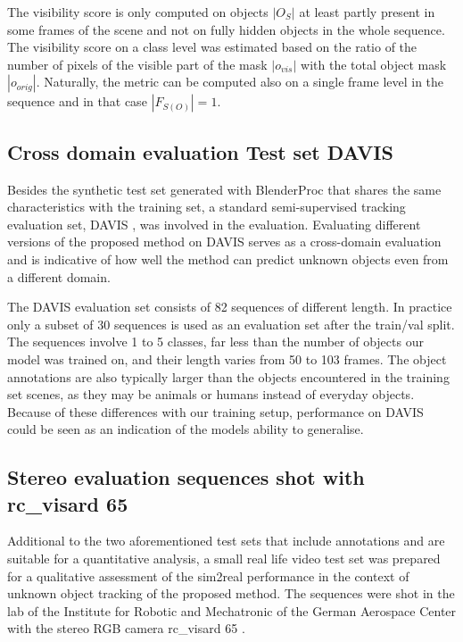  The visibility score is only computed on objects $|O_S|$ at least partly present in some frames of the scene and not on fully hidden objects in the whole sequence. The visibility score on a class level was estimated based on the ratio of the number of pixels of the visible part of the mask $|o_{vis}|$ with the total object mask $|o_{orig}|$. Naturally, the metric can be computed also on a single frame level in the sequence and in that case $|F_{S(O)}| = 1$. \par




\subsection{Cross domain evaluation Test set DAVIS}
Besides the synthetic test set generated with BlenderProc that shares the same characteristics with the training set, a standard semi-supervised tracking evaluation set, DAVIS \parencite{davis}, was involved in the evaluation. Evaluating different versions of the proposed method on DAVIS serves as a cross-domain evaluation and is indicative of how well the method can predict unknown objects even from a different domain. \par
The DAVIS evaluation set consists of 82 sequences of different length. In practice only a subset of 30 sequences is used as an evaluation set after the train/val split. The sequences involve 1 to 5 classes, far less than the number of objects our model was trained on, and their length varies from 50 to 103 frames. The object annotations are also typically larger than the objects encountered in the training set scenes, as they may be animals or humans instead of everyday objects. Because of these differences with our training setup, performance on DAVIS could be seen as an indication of the models ability to generalise. \par

\subsection{Stereo evaluation sequences shot with rc\_visard 65}

Additional to the two aforementioned test sets that include annotations and are suitable for a quantitative analysis, a small real life video test set was prepared for a qualitative assessment of the sim2real performance in the context of unknown object tracking of the proposed method. The sequences were shot in the lab of the Institute for Robotic and Mechatronic of the German Aerospace Center with the stereo RGB camera rc\_visard 65 \parencite{rcvisard}. \par

